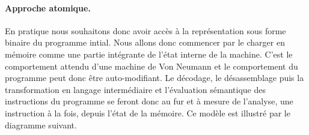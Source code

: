 


\paragraph{Approche atomique.}
En pratique nous souhaitons donc avoir accès à la représentation sous forme binaire du programme intial.
Nous allons donc commencer par le charger en mémoire comme une partie intégrante de l'état interne de la machine.
C'est le comportement attendu d'une machine de Von Neumann et le comportement du programme peut donc être auto-modifiant. Le décodage, le désassemblage puis la transformation en langage intermédiaire et l'évaluation sémantique des instructions du programme se feront donc au fur et à mesure de l'analyse, une instruction à la fois, depuis l'état de la mémoire.
Ce modèle est illustré par le diagramme suivant.


